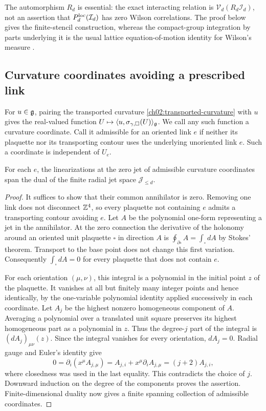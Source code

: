 The automorphism $R_d$ is essential: the exact interacting relation is
$\mathcal V_d(R_d\mathcal I_d)$, not an assertion that
$P_d^{\rm loc}(\mathcal I_d)$ has zero Wilson correlations.
The proof below gives the finite-stencil construction, whereas the
compact-group integration by parts underlying it is the usual lattice
equation-of-motion identity for Wilson's measure
\cite{Wilson1974,OsterwalderSeiler1978}.

\subsection{Curvature coordinates avoiding a prescribed link}

For $u\in\mathfrak g$, pairing the transported curvature
\eqref{ch02:transported-curvature} with $u$ gives the real-valued function
$U\mapsto\langle u,\sigma_{\gamma,\square}(U)\rangle_{\mathfrak g}$.
We call any such function a curvature coordinate.
Call it admissible for an oriented link $e$ if neither its plaquette
nor its transporting contour uses the underlying unoriented link $e$.
Such a coordinate is independent of $U_e$.

\begin{lemma}\label{ch02:avoiding-tests}
For each $e$, the linearizations at the zero jet of admissible
curvature coordinates span the dual of the finite radial jet space
$\mathcal J_{\le d}$.
\end{lemma}
\begin{proof}
It suffices to show that their common annihilator is zero.
Removing one link does not disconnect $\mathbb Z^4$, so every plaquette
not containing $e$ admits a transporting contour avoiding $e$.
Let $A$ be the polynomial one-form representing a jet in the annihilator.
At the zero connection the derivative of the holonomy around an oriented
unit plaquette $\square$ in direction $A$ is
$\oint_{\partial\square}A=\int_\square dA$ by Stokes' theorem.
Transport to the base point does not change this first variation.
Consequently $\int_\square dA=0$ for every plaquette that does not
contain $e$.

For each orientation $(\mu,\nu)$, this integral is a polynomial in
the initial point $z$ of the plaquette. It vanishes at all but finitely
many integer points and hence identically, by the one-variable polynomial
identity applied successively in each coordinate. Let $A_j$ be the
highest nonzero homogeneous component of $A$. Averaging a polynomial over
a translated unit square preserves its highest homogeneous part as a
polynomial in $z$. Thus the degree-$j$ part of the integral is
$(dA_j)_{\mu\nu}(z)$. Since the integral vanishes for every orientation,
$dA_j=0$. Radial gauge and Euler's identity give
\[
 0=\partial_i(x^\mu A_{j,\mu})
   =A_{j,i}+x^\mu\partial_i A_{j,\mu}
   =(j+2)A_{j,i},
\]
where closedness was used in the last equality.
This contradicts the choice of $j$. Downward induction on the degree of the components
proves the assertion. Finite-dimensional duality now gives a
finite spanning collection of admissible coordinates.
\end{proof}

